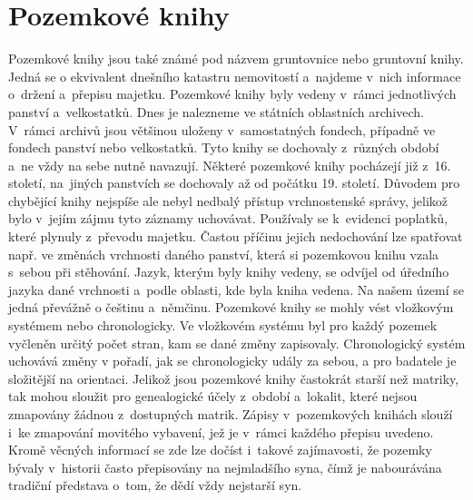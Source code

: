 \section{Pozemkové knihy}
Pozemkové knihy \cite{SestavteSiRodokmen, hledaniPredku} jsou také známé pod názvem gruntovnice nebo gruntovní knihy. Jedná se o ekvivalent dnešního katastru nemovitostí a~najdeme v~nich informace o~držení a~přepisu majetku. Pozemkové knihy byly vedeny v~rámci jednotlivých panství a~velkostatků. Dnes je nalezneme ve státních oblastních archivech. V~rámci archivů jsou většinou uloženy v~samostatných fondech, případně ve fondech panství nebo velkostatků. Tyto knihy se dochovaly z~různých období a~ne vždy na sebe nutně navazují. Některé pozemkové knihy pocházejí již z~16. století, na~jiných panstvích se dochovaly až od počátku 19. století. Důvodem pro chybějící knihy nejspíše ale nebyl nedbalý přístup vrchnostenské správy, jelikož bylo v~jejím zájmu tyto záznamy uchovávat. Používaly se k~evidenci poplatků, které plynuly z~převodu majetku. Častou příčinu jejich nedochování lze spatřovat např. ve změnách vrchnosti daného panství, která si pozemkovou knihu vzala s~sebou při stěhování. Jazyk, kterým byly knihy vedeny, se odvíjel od úředního jazyka dané vrchnosti a~podle oblasti, kde byla kniha vedena. Na našem území se jedná převážně o češtinu a~němčinu. Pozemkové knihy se mohly vést vložkovým systémem nebo chronologicky. Ve vložkovém systému byl pro každý pozemek vyčleněn určitý počet stran, kam se dané změny zapisovaly. Chronologický systém uchovává změny v pořadí, jak se chronologicky udály za sebou, a pro badatele je složitější na orientaci. Jelikož jsou pozemkové knihy častokrát starší než matriky, tak mohou sloužit pro genealogické účely z~období a~lokalit, které nejsou zmapovány žádnou z~dostupných matrik. Zápisy v~pozemkových knihách slouží i~ke zmapování movitého vybavení, jež je v~rámci každého přepisu uvedeno. Kromě věcných informací se zde lze dočíst i~takové zajímavosti, že pozemky bývaly v~historii často přepisovány na nejmladšího syna, čímž je nabourávána tradiční představa o~tom, že dědí vždy nejstarší syn.

